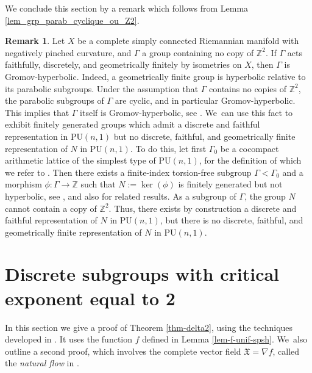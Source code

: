 \documentclass[JEP,XML,SOM,Unicode,NoEqCountersInSection,published]{cedram}
\theoremstyle{definition}
\newtheorem*{remark}{Remark}
\newcommand{\Z}{\mathbb{Z}}
\newcommand{\PU}{\mathrm{PU}}
\newcommand{\PU}{\mathrm{PU}}
\begin{document}
We conclude this section by a remark which follows from Lemma \ref{lem_grp_parab_cyclique_ou_Z2}.
\begin{remark}
Let $X$ be a complete simply connected Riemannian manifold with negatively pinched curvature, and $\Gamma$ a group containing no copy of $\Z^{2}$. If $\Gamma$ acts faithfully, discretely, and geometrically finitely by isometries on $X$, then $\Gamma$ is Gromov-hyperbolic. Indeed, a geometrically finite group is hyperbolic relative to its parabolic subgroups. Under the assumption that $\Gamma$ contains no copies of $\Z^{2}$, the parabolic subgroups of $\Gamma$ are cyclic, and in particular Gromov-hyperbolic. This implies that $\Gamma$ itself is Gromov-hyperbolic, see \cite{osinRelativelyHyperbolicGroups2006}. We~can use this fact to exhibit finitely generated groups which admit a discrete and faithful representation in $\PU(n,1)$ but no discrete, faithful, and geometrically finite representation of $N$ in $\PU(n,1)$. To do this, let first $\Gamma_0$ be a cocompact arithmetic lattice of the simplest type of $\PU(n,1)$, for the definition of which we refer to \cite[\S VIII.5]{borelContinuousCohomologyDiscrete2000}. Then there exists a finite-index torsion-free subgroup $\Gamma<\Gamma_0$ and a morphism $\phi:\Gamma \to \Z$ such that $N:=\ker(\phi)$ is finitely generated but not hyperbolic, see \cite{llosaisenrichSubgroupsHyperbolicGroups2024}, and also \cite{italianoHyperbolic5manifoldsThat2023-manuel} for related results. As a subgroup of $\Gamma$, the group $N$ cannot contain a copy of $\Z^{2}$. Thus, there exists by construction a discrete and faithful representation of $N$ in $\PU(n,1)$, but there is no discrete, faithful, and geometrically finite representation of $N$ in $\PU(n,1)$.
\end{remark}

\section{Discrete subgroups with critical exponent equal to 2}\label{section-delta2}

In this section we give a proof of Theorem \ref{thm-delta2}, using the techniques developed in \cite{connellNaturalFlowCritical2023}. It uses the function $f$ defined in Lemma \ref{lem-f-unif-spsh}. We~also outline a second proof, which involves the complete vector field $\mathfrak{X}=\nabla{f}$, called the \textit{natural flow} in \cite{connellNaturalFlowCritical2023}.
\end{document}
